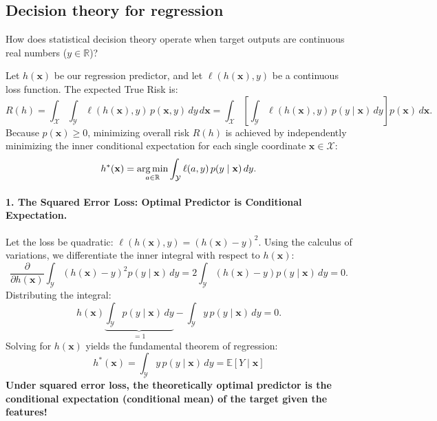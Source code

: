 \subsection{Decision theory for regression}
\label{sec:regression_decision_theory}

How does statistical decision theory operate when target outputs are continuous real numbers ($y \in \mathbb{R}$)? 

Let $h(\mathbf{x})$ be our regression predictor, and let $\ell(h(\mathbf{x}), y)$ be a continuous loss function. The expected True Risk is:
\begin{equation}
R(h) = \int_{\mathcal{X}} \int_{\mathcal{Y}} \ell(h(\mathbf{x}), y) \, p(\mathbf{x}, y) \, dy \, d\mathbf{x} = \int_{\mathcal{X}} \left[ \int_{\mathcal{Y}} \ell(h(\mathbf{x}), y) \, p(y \mid \mathbf{x}) \, dy \right] p(\mathbf{x}) \, d\mathbf{x}.
\end{equation}
Because $p(\mathbf{x}) \ge 0$, minimizing overall risk $R(h)$ is achieved by independently minimizing the inner conditional expectation for each single coordinate $\mathbf{x} \in \mathcal{X}$:
\begin{equation}
h^*(\mathbf{x}) = \operatorname*{arg\,min}_{a \in \mathbb{R}} \int_{\mathcal{Y}} \ell(a, y) \, p(y \mid \mathbf{x}) \, dy.
\end{equation}

\paragraph{1. The Squared Error Loss: Optimal Predictor is Conditional Expectation.}
Let the loss be quadratic: $\ell(h(\mathbf{x}), y) = (h(\mathbf{x}) - y)^2$.
Using the calculus of variations, we differentiate the inner integral with respect to $h(\mathbf{x})$:
\begin{equation}
\frac{\partial}{\partial h(\mathbf{x})} \int_{\mathcal{Y}} (h(\mathbf{x}) - y)^2 p(y \mid \mathbf{x}) \, dy = 2 \int_{\mathcal{Y}} (h(\mathbf{x}) - y) p(y \mid \mathbf{x}) \, dy = 0.
\end{equation}
Distributing the integral:
\begin{equation}
h(\mathbf{x}) \underbrace{\int_{\mathcal{Y}} p(y \mid \mathbf{x}) \, dy}_{= 1} - \int_{\mathcal{Y}} y \, p(y \mid \mathbf{x}) \, dy = 0.
\end{equation}
Solving for $h(\mathbf{x})$ yields the fundamental theorem of regression:
\begin{equation}
\boxed{ h^*(\mathbf{x}) = \int_{\mathcal{Y}} y \, p(y \mid \mathbf{x}) \, dy = \mathbb{E}[Y \mid \mathbf{x}] }
\label{eq:optimal_regression_conditional_expectation}
\end{equation}
\textbf{Under squared error loss, the theoretically optimal predictor is the conditional expectation (conditional mean) of the target given the features!}

